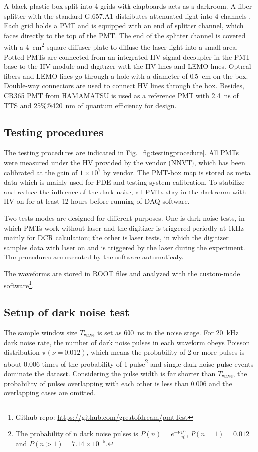 A black plastic box split into 4 grids with clapboards acts as a darkroom. A fiber splitter with the standard G.657.A1 distributes attenuated light into 4 channels \cite{Splitter}. Each grid holds a PMT and is equipped with an end of splitter channel, which faces directly to the top of the PMT. The end of the splitter channel is covered with a \SI{4}{cm\tothe{2}} square diffuser plate to diffuse the laser light into a small area. Potted PMTs are connected from an integrated HV-signal decoupler in the PMT base to the HV module and digitizer with the HV lines and LEMO lines. Optical fibers and LEMO lines go through a hole with a diameter of \SI{0.5}{cm} on the box. Double-way connectors are used to connect HV lines through the box. Besides, CR365 PMT \cite{BJBS} from HAMAMATSU is used as a reference PMT with \SI{2.4}{ns} of TTS and 25\%@\SI{420}{nm} of quantum efficiency for design.

\subsection{Testing procedures}

The testing procedures are indicated in Fig.~\ref{fig:testingprocedure}. All PMTs were measured under the HV provided by the vendor (NNVT), which has been calibrated at the gain of $1\times10^7$ by vendor. 
The PMT-box map is stored as meta data which is mainly used for PDE and testing system calibration. To stabilize and reduce the influence of the dark noise, all PMTs stay in the darkroom with HV on for at least 12 hours before running of DAQ software.

Two tests modes are designed for different purposes. One is dark noise tests, in which PMTs work without laser and the digitizer is triggered periodly at 1kHz mainly for DCR calculation; the other is laser tests, in which the digitizer samples data with laser on and is triggered by the laser during the experiment. The procedures are executed by the software automaticaly.

The waveforms are stored in ROOT files and analyzed with the custom-made software\footnote{Github repo: \url{https://github.com/greatofdream/pmtTest}}.

\subsection{Setup of dark noise test}
The sample window size $T_{\mathrm{wave}}$ is set as \SI{600}{ns} in the noise stage. For \SI{20}{kHz} dark noise rate, the number of dark noise pulses in each waveform obeys Poisson distribution $\mathrm{\pi}(\nu=0.012)$, which means the probability of 2 or more pulses is about 0.006 times of the probability of 1 pulse\footnote{The probability of n dark noise pulses is $P(n)=e^{-\nu}\frac{\nu^n}{n!}$, $P(n=1)=0.012$ and $P(n>1)=7.14\times10^{-5}$.} and single dark noise pulse events dominate the dataset. Considering the pulse width is far shorter than $T_{\mathrm{wave}}$, the probability of pulses overlapping with each other is less than 0.006 and the overlapping cases are omitted.

